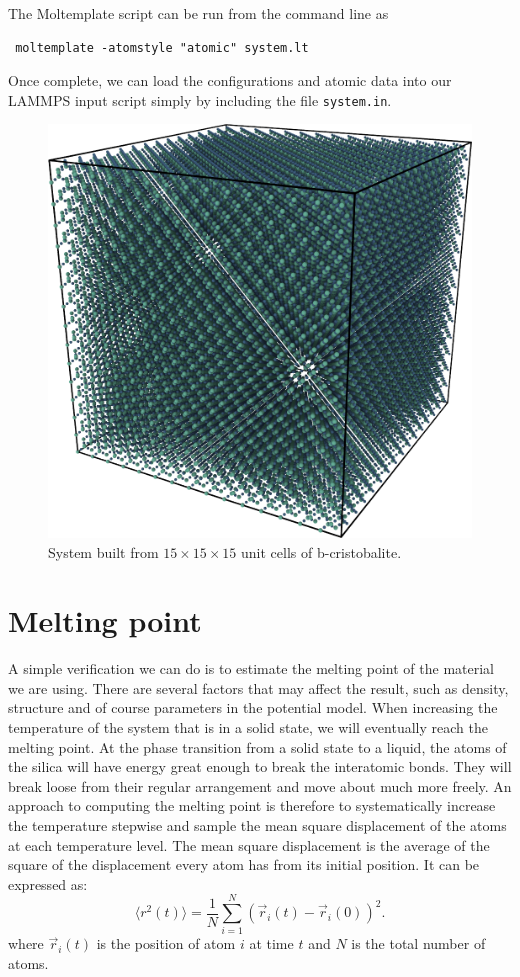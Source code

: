 \documentclass[twoside,english]{uiofysmaster}
\newcommand\lr[1]{\left(#1\right)}
\begin{document}
The Moltemplate script can be run from the command line as
 \begin{lstlisting}
 moltemplate -atomstyle "atomic" system.lt
 \end{lstlisting}
Once complete, we can load the configurations and atomic data into our LAMMPS input script simply by including the file \texttt{system.in}.



\begin{figure}[H]
	\centering
	\includegraphics[width=0.5\linewidth]{figures/CreatingSystem/cube}
	\caption{System built from $15\times15\times15$ unit cells of b-cristobalite.}
	\label{fig:hugeCube}
\end{figure}


\section{Melting point}\label{sec:meltingPoint}
A simple verification we can do is to estimate the melting point of the material we are using. 
There are several factors that may affect the result, such as density, structure and of course parameters in the potential model. 
When increasing the temperature of the system that is in a solid state, we will eventually reach the melting point.
At the phase transition from a solid state to a liquid, the atoms of the silica will have energy great enough to break the interatomic bonds. 
They will break loose from their regular arrangement and move about much more freely. 
An approach to computing the melting point is therefore to systematically increase the temperature stepwise and sample the mean square displacement of the atoms at each temperature level.  
The mean square displacement is the average of the square of the displacement every atom has from its initial position. It can be expressed as:
\begin{equation}
\langle r^2(t)\rangle = \frac{1}{N}\sum_{i=1}^{N}\lr{\vec{r}_i(t)-\vec{r}_i(0)}^2. \label{eq: diffusion constant}
\end{equation}
where $\vec{r}_i(t)$ is the position of atom $i$ at time $t$ and $N$ is the total number of atoms. 
\end{document}
